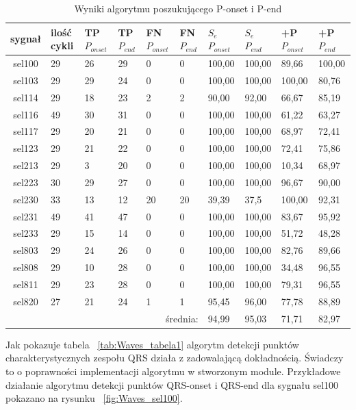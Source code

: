 \begin{table}[!h]
\caption{Wyniki algorytmu poszukującego P-onset i P-end}
\label{tab:Waves_tabela2}
\begin{tabularx}{\textwidth}{|c|p{0.8cm}|X|X|X|p{0.7cm}|p{0.8cm}|p{0.8cm}|X|X|}
\hline
sygnał &
ilość  cykli &
TP $P_{onset}$ &
TP $P_{end}$ &
FN $P_{onset}$ &
FN $P_{end}$&
 $S_e$ $P_{onset}$ &
 $S_e$ $P_{end}$ &
+P  $P_{onset}$  &
+P  $P_{end}$ \\
\hline
sel100 &
29 &
26 &
29 &
0 &
0 &
100,00 &
100,00 &
89,66 &
100,00 \\
sel103 &
29 &
29 &
24 &
0 &
0 &
100,00 &
100,00 &
100,00  &
80,76 \\
sel114 &
29 &
18 &
23 &
2 &
2 &
90,00 &
92,00 &
66,67  &
85,19 \\
sel116 &
49 &
30 &
31 &
0 &
0 &
100,00 &
100,00 &
61,22  &
63,27 \\
sel117 &
29 &
20 &
21 &
0 &
0 &
100,00 &
100,00 &
68,97  &
72,41 \\
sel123 &
29 &
21 &
22 &
0 &
0 &
100,00 &
100,00 &
72,41  &
75,86 \\
sel213 &
29 &
3 &
20 &
0 &
0 &
100,00 &
100,00 &
10,34  &
68,97 \\
sel223 &
30 &
29 &
27 &
0 &
0 &
100,00 &
100,00 &
96,67  &
90,00 \\
sel230 &
33 &
13 &
12 &
20 &
20 &
39,39 &
37,5 &
100,00 &
92,31 \\
sel231 &
49 &
41 &
47 &
0 &
0 &
100,00 &
100,00 &
83,67  &
95,92 \\
sel233 &
29 &
15 &
14 &
0 &
0 &
100,00 &
100,00 &
51,72  &
48,28 \\
sel803 &
29 &
24 &
26 &
0 &
0 &
100,00 &
100,00 &
82,76  &
89,66 \\
sel808 &
29 &
10 &
28 &
0 &
0 &
100,00 &
100,00 &
34,48  &
96,55 \\
sel811 &
29 &
23 &
28 &
0 &
0 &
100,00 &
100,00 &
79,31  &
96,55 \\
sel820 &
27 &
21 &
24 &
1 &
1 &
95,45 &
96,00 &
77,78  &
88,89 \\
\hline \hline
\multicolumn{6}{|r|}{średnia:}   &
94,99 &
95,03 &
71,71 &
82,97 \\
\hline

\end{tabularx}
\end{table}

Jak pokazuje tabela ~\ref{tab:Waves_tabela1} algorytm detekcji punktów charakterystycznych zespołu QRS działa z zadowalającą dokładnością. Świadczy to o poprawności implementacji algorytmu w stworzonym module. Przykładowe działanie algorytmu detekcji punktów QRS-onset i QRS-end dla sygnału sel100 pokazano na rysunku ~\ref{fig:Waves_sel100}.

